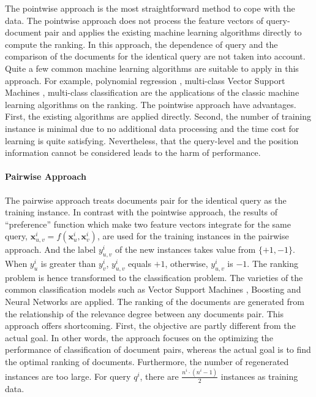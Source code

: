 The pointwise approach is the most straightforward method to cope with the data. The pointwise approach does not process the feature vectors of query-document pair and applies the existing machine learning algorithms directly to compute the ranking. In this approach, the dependence of query and the comparison of the documents for the identical query are not taken into account. Quite a few common machine learning algorithms are suitable to apply in this approach. For example, polynomial regression \citep{fuhr1989optimum}, multi-class Vector Support Machines \citep{crammer2001algorithmic}, multi-class classification \citep{li2007mcrank} are the applications of the classic machine learning algorithms on the ranking. The pointwise approach have advantages. First, the existing algorithms are applied directly. Second, the number of training instance is minimal due to no additional data processing and the time cost for learning is quite satisfying. Nevertheless, that the query-level and the position information cannot be considered leads to the harm of performance.

\paragraph{Pairwise Approach}

The pairwise approach treats documents pair for the identical query as the training instance. In contrast with the pointwise approach, the results of ``preference'' function which make two feature vectors integrate for the same query, $\mathbf{x}_{u, v}^i = f(\mathbf{x}_u^i, \mathbf{x}_v^i)$, are used for the training instances in the pairwise approach. And the label $y_{u,v}^i$ of the new instances takes value from $\{+1, -1\}$. When $y_u^i$ is greater than $y_v^i$, $y_{u,v}^i$ equals $+1$, otherwise, $y_{u,v}^i$ is $-1$. The ranking problem is hence transformed to the classification problem. The varieties of the common classification models such as Vector Support Machines \citep{joachims2002optimizing}, Boosting \citep{freund2003efficient} and Neural Networks \citep{tsai2007frank} are applied. The ranking of the documents are generated from the relationship of the relevance degree between any documents pair. This approach offers shortcoming. First, the objective are partly different from the actual goal. In other words, the approach focuses on the optimizing the performance of classification of document pairs, whereas the actual goal is to find the optimal ranking of documents. Furthermore, the number of regenerated instances are too large. For query $q^i$, there are $\frac{n^i\cdot(n^i-1)}{2}$ instances as training data. 

